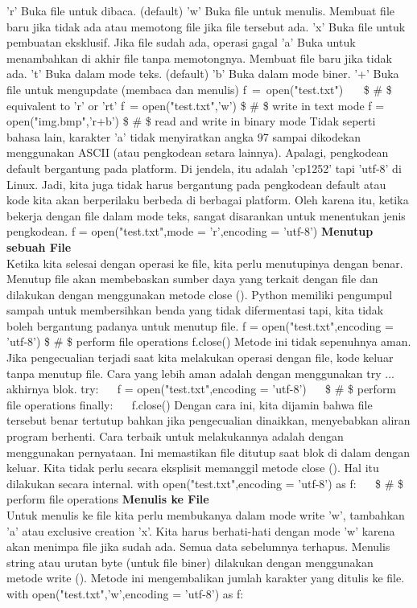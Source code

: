 'r' \hspace*{0.5in}  
Buka file untuk dibaca. (default)
'w' \hspace*{0.5in}  
Buka file untuk menulis. Membuat file baru jika tidak ada atau memotong file jika file tersebut ada.  
'x' \hspace*{0.5in}   
Buka file untuk pembuatan eksklusif. Jika file sudah ada, operasi gagal 
'a' \hspace*{0.5in}   
Buka untuk menambahkan di akhir file tanpa memotongnya. Membuat file baru jika tidak ada. 
't' \hspace*{0.5in}   
Buka dalam mode teks. (default)  
'b' 
Buka dalam mode biner.  
'+'  
Buka file untuk mengupdate (membaca dan menulis)  
f~=~open("test.txt")~~~    \$  \#  \$ equivalent to 'r' or 'rt'  
f~= open("test.txt",'w')   \$  \#  \$ write in text mode  
f = open("img.bmp",'r+b')  \$  \#  \$ read and write in binary mode  
Tidak seperti bahasa lain, karakter 'a' tidak menyiratkan angka 97 sampai dikodekan menggunakan ASCII (atau pengkodean setara lainnya). Apalagi, pengkodean default bergantung pada platform. Di jendela, itu adalah 'cp1252' tapi 'utf-8' di Linux. Jadi, kita juga tidak harus bergantung pada pengkodean default atau kode kita akan berperilaku berbeda di berbagai platform. Oleh karena itu, ketika bekerja dengan file dalam mode teks, sangat disarankan untuk menentukan jenis pengkodean.  
f = open("test.txt",mode = 'r',encoding = 'utf-8')  
{\fontsize{14pt}{14pt}\selectfont \textbf{Menutup sebuah File} \\} 
Ketika kita selesai dengan operasi ke file, kita perlu menutupinya dengan benar. Menutup file akan membebaskan sumber daya yang terkait dengan file dan dilakukan dengan menggunakan metode close (). Python memiliki pengumpul sampah untuk membersihkan benda yang tidak difermentasi tapi, kita tidak boleh bergantung padanya untuk menutup file. 
f = open("test.txt",encoding = 'utf-8')  
 \$  \#  \$ perform file operations 
f.close() 
Metode ini tidak sepenuhnya aman. Jika pengecualian terjadi saat kita melakukan operasi dengan file, kode keluar tanpa menutup file. Cara yang lebih aman adalah dengan menggunakan try ... akhirnya blok.
try:  
~~ f = open("test.txt",encoding = 'utf-8')  
~~  \$  \#  \$ perform file operations 
finally: 
~~ f.close() 
Dengan cara ini, kita dijamin bahwa file tersebut benar tertutup bahkan jika pengecualian dinaikkan, menyebabkan aliran program berhenti. Cara terbaik untuk melakukannya adalah dengan menggunakan pernyataan. Ini memastikan file ditutup saat blok di dalam dengan keluar. Kita tidak perlu secara eksplisit memanggil metode close (). Hal itu dilakukan secara internal.  
with open("test.txt",encoding = 'utf-8') as f:  
~~  \$  \#  \$ perform file operations 
{\fontsize{14pt}{14pt}\selectfont \textbf{Menulis ke File} \\} 
Untuk menulis ke file kita perlu membukanya dalam mode write 'w', tambahkan 'a' atau exclusive creation 'x'. Kita harus berhati-hati dengan mode 'w' karena akan menimpa file jika sudah ada. Semua data sebelumnya terhapus. Menulis string atau urutan byte (untuk file biner) dilakukan dengan menggunakan metode write (). Metode ini mengembalikan jumlah karakter yang ditulis ke file.  
with open("test.txt",'w',encoding = 'utf-8') as f: 

